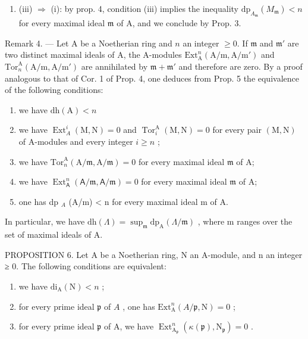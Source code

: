 \begin{enumerate}
\def\labelenumi{(\roman{enumi})}
\setcounter{enumi}{2}
\tightlist
\item
  (iii) \(\Rightarrow\) (i): by prop. 4, condition (iii) implies the inequality \(\mathrm{dp}_{A_{\mathfrak{m}}}(M_{\mathfrak{m}}) < n\) for every maximal ideal \(\mathfrak{m}\) of A, and we conclude by Prop. 3.
\end{enumerate}

Remark 4. — Let A be a Noetherian ring and \(n\) an integer \(\geqslant 0\). If \(\mathfrak{m}\) and \(\mathfrak{m}'\) are two distinct maximal ideals of A, the A-modules \(\mathrm{Ext}_{\mathrm{A}}^{n}(\mathrm{A/m},\mathrm{A/m}')\) and \(\mathrm{Tor}_{n}^{\mathrm{A}}(\mathrm{A/m},\mathrm{A/m}')\) are annihilated by \(\mathfrak{m} + \mathfrak{m}'\) and therefore are zero. By a proof analogous to that of Cor. 1 of Prop. 4, one deduces from Prop. 5 the equivalence of the following conditions:

\begin{enumerate}
\def\labelenumi{(\roman{enumi})}
\item
  we have \(\mathrm{dh}(\mathrm{A}) < n\)
\item
  we have \(\operatorname{Ext}_A^i (\mathrm{M},\mathrm{N}) = 0\) and \(\operatorname{Tor}_i^{\mathrm{A}}(\mathrm{M},\mathrm{N}) = 0\) for every pair \((\mathrm{M},\mathrm{N})\) of A-modules and every integer \(i\geqslant n\) ;
\item
  we have \(\mathrm{Tor}_n^{\mathrm{A}}(\mathrm{A} / \mathfrak{m},\mathrm{A} / \mathfrak{m}) = 0\) for every maximal ideal \(\mathfrak{m}\) of A;
\item
  we have \(\operatorname{Ext}_{\mathsf{A}}^{n}(\mathsf{A} / \mathfrak{m},\mathsf{A} / \mathfrak{m}) = 0\) for every maximal ideal \(\mathfrak{m}\) of A;
\item
  one has dp \(_{A}\) (A/m) \textless{} n for every maximal ideal m of A.
\end{enumerate}

In particular, we have \(\mathrm{dh}(\Lambda)=\sup_{\mathfrak{m}}\mathrm{dp}_{\mathrm{A}}(\Lambda/\mathfrak{m})\) , where m ranges over the set of maximal ideals of A.

PROPOSITION 6. Let A be a Noetherian ring, N an A-module, and n an integer ≥ 0. The following conditions are equivalent:

\begin{enumerate}
\def\labelenumi{(\roman{enumi})}
\item
  we have \(\mathrm{di}_{\mathrm{A}}(\mathrm{N}) < n\) ;
\item
  for every prime ideal \(\mathfrak{p}\) of \(A\) , one has \(\mathrm{Ext}_{\mathrm{A}}^{n}(A/\mathfrak{p},\mathrm{N})=0\) ;
\item
  for every prime ideal \(\mathfrak{p}\) of A, we have \(\operatorname{Ext}_{\mathrm{A}_{\mathfrak{p}}}^{n}(\kappa(\mathfrak{p}),\mathrm{N}_{\mathfrak{p}})=0\) .
\end{enumerate}

